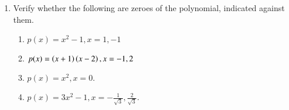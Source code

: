 \renewcommand{\theequation}{\theenumi}
\begin{enumerate}[label=\arabic*.,ref=\thesubsection.\theenumi]
\item Verify whether the following are zeroes of the polynomial, indicated against them. 
\begin{enumerate}

\item $ p(x) = x^2-1, x = 1, -1$
\item $ p(x) = \left(x+1\right) \left(x-2\right), x = -1,2$
\item $ p(x) = x^2, x = 0$.
\item $ p(x) = 3x^2-1, x = -\frac{1}{\sqrt{3}}, \frac{2}{\sqrt{3}}$.
\end{enumerate}
\end{enumerate}